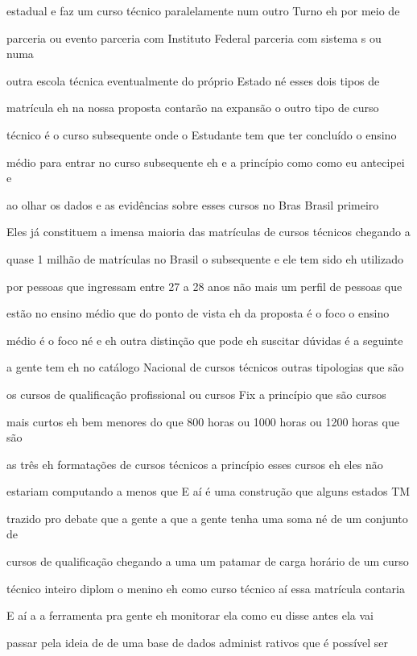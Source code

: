 \documentclass[a4paper,12pt]{article}
\begin{document}
estadual e faz um curso técnico paralelamente num outro Turno eh por meio de

parceria ou evento parceria com Instituto Federal parceria com sistema s ou numa

outra escola técnica eventualmente do próprio Estado né esses dois tipos de

matrícula eh na nossa proposta contarão na expansão o outro tipo de curso

técnico é o curso subsequente onde o Estudante tem que ter concluído o ensino

médio para entrar no curso subsequente eh e a princípio como como eu antecipei e

ao olhar os dados e as evidências sobre esses cursos no Bras Brasil primeiro

Eles já constituem a imensa maioria das matrículas de cursos técnicos chegando a

quase 1 milhão de matrículas no Brasil o subsequente e ele tem sido eh utilizado

por pessoas que ingressam entre 27 a 28 anos não mais um perfil de pessoas que

estão no ensino médio que do ponto de vista eh da proposta é o foco o ensino

médio é o foco né e eh outra distinção que pode eh suscitar dúvidas é a seguinte

a gente tem eh no catálogo Nacional de cursos técnicos outras tipologias que são

os cursos de qualificação profissional ou cursos Fix a princípio que são cursos

mais curtos eh bem menores do que 800 horas ou 1000 horas ou 1200 horas que são

as três eh formatações de cursos técnicos a princípio esses cursos eh eles não

estariam computando a menos que E aí é uma construção que alguns estados TM

trazido pro debate que a gente a que a gente tenha uma soma né de um conjunto de

cursos de qualificação chegando a uma um patamar de carga horário de um curso

técnico inteiro diplom o menino eh como curso técnico aí essa matrícula contaria

E aí a a ferramenta pra gente eh monitorar ela como eu disse antes ela vai

passar pela ideia de de uma base de dados administ rativos que é possível ser
\end{document}
